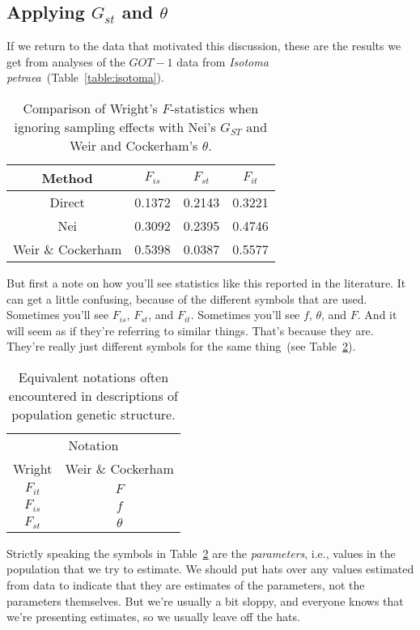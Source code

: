 \documentclass[12pt]{article}
\begin{document}
\subsection*{Applying $G_{st}$ and $\theta$}

If we return to the data that motivated this discussion, these are the
results we get from analyses of the $GOT-1$ data from {\it Isotoma
  petraea}~(Table~\ref{table:isotoma}).
\begin{table}
\begin{center}
  \begin{tabular}{c|ccc}
\hline\hline
Method & $F_{is}$ & $F_{st}$ & $F_{it}$ \\
\hline
Direct            & 0.1372 & 0.2143 & 0.3221 \\
Nei               & 0.3092 & 0.2395 & 0.4746 \\
Weir \& Cockerham & 0.5398 & 0.0387 & 0.5577 \\
\hline
\end{tabular}
\end{center}
\caption{Comparison of Wright's $F$-statistics when ignoring sampling
  effects with Nei's $G_{ST}$ and Weir and Cockerham's $\theta$.}\label{table:fst-comparison}
\end{table}
But first a note on how you'll see statistics like this reported in
the literature. It can get a little confusing, because of the
different symbols that are used. Sometimes you'll see $F_{is}$,
$F_{st}$, and $F_{it}$. Sometimes you'll see $f$, $\theta$, and
$F$. And it will seem as if they're referring to similar
things. That's because they are. They're really just different symbols
for the same thing~(see
Table~\ref{table:fst-theta}).
\begin{table}
\begin{center}
\begin{tabular}{cc}
\hline\hline
\multicolumn{2}{c}{Notation} \\
Wright & Weir \& Cockerham \\
\hline
$F_{it}$ & $F$ \\
$F_{is}$ & $f$ \\
$F_{st}$ & $\theta$ \\
\hline
\end{tabular}
\end{center}
\caption{Equivalent notations often encountered in descriptions of
  population genetic structure.}\label{table:fst-theta}
\end{table}
Strictly speaking the symbols in Table~\ref{table:fst-theta} are the
{\it parameters}, i.e., values in the population that we try to
estimate. We should put hats over any values estimated from data to
indicate that they are estimates of the parameters, not the parameters
themselves. But we're usually a bit sloppy, and everyone knows that
we're presenting estimates, so we usually leave off the hats.
\end{document}
